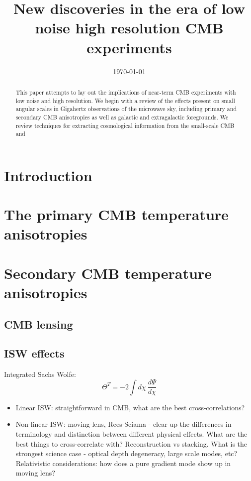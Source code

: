 \documentclass[aps,nofootinbib,groupedaddress]{revtex4}
\begin{document}
\title{New discoveries in the era of low noise high resolution CMB experiments}



\date{\today}

\begin{abstract}
This paper attempts to lay out the implications of near-term CMB experiments with low noise and high resolution. We begin with a review of the effects present on small angular scales in Gigahertz observations of the microwave sky, including primary and secondary CMB anisotropies as well as galactic and extragalactic foregrounds. We review techniques for extracting cosmological information from the small-scale CMB and 
\end{abstract}

\maketitle

\tableofcontents



\section{Introduction}

\section{The primary CMB temperature anisotropies}

\section{Secondary CMB temperature anisotropies}

\subsection{CMB lensing}

\subsection{ISW effects}

Integrated Sachs Wolfe:
\begin{equation}
\Theta^T = -2\int d\chi \ \frac{d \Psi}{d\chi}
\end{equation}
\begin{itemize}
\item Linear ISW: straightforward in CMB, what are the best cross-correlations?
\item Non-linear ISW: moving-lens, Rees-Sciama - clear up the differences in terminology and distinction between different physical effects. What are the best things to cross-correlate with? Reconstruction vs stacking. What is the strongest science case - optical depth degeneracy, large scale modes, etc? Relativistic considerations: how does a pure gradient mode show up in moving lens?
\end{itemize}
\end{document}
